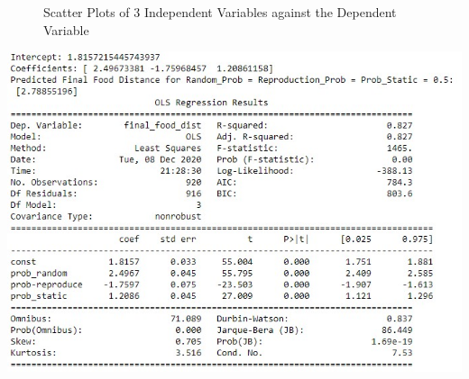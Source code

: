 \documentclass[a4paper, 11pt]{article}
\begin{document}
\begin{figure}[h!]
\centering
{}

\caption{Scatter Plots of 3 Independent Variables against the Dependent Variable}
\label{fig:Graphs}
\end{figure}
\begin{center}
    \includegraphics[scale = 0.9]{Images/data.jpg}
\end{center}
\newpage
\end{document}
